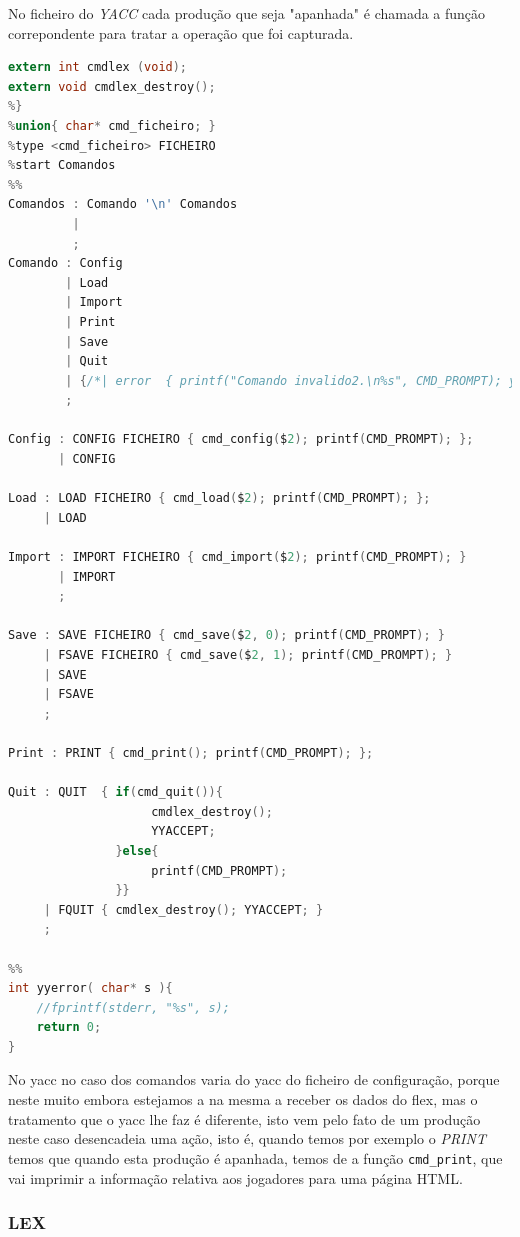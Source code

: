 \documentclass[11pt, a4paper, oneside]{article}
\begin{document}
No ficheiro do \textit{YACC} cada produção que seja "apanhada" é chamada a função correpondente para tratar a operação que foi capturada.

\begin{lstlisting}[language=C, caption={YACC do ficheiro cmd.}]
extern int cmdlex (void);
extern void cmdlex_destroy();
%}
%union{ char* cmd_ficheiro; }
%type <cmd_ficheiro> FICHEIRO
%start Comandos
%%
Comandos : Comando '\n' Comandos
         | 
         ;
Comando : Config
        | Load
        | Import
        | Print
        | Save
        | Quit
        | {/*| error  { printf("Comando invalido2.\n%s", CMD_PROMPT); yyclearin; yyerrok; }*/}
        ;

Config : CONFIG FICHEIRO { cmd_config($2); printf(CMD_PROMPT); };
       | CONFIG

Load : LOAD FICHEIRO { cmd_load($2); printf(CMD_PROMPT); };
     | LOAD

Import : IMPORT FICHEIRO { cmd_import($2); printf(CMD_PROMPT); }
       | IMPORT
       ;

Save : SAVE FICHEIRO { cmd_save($2, 0); printf(CMD_PROMPT); }
     | FSAVE FICHEIRO { cmd_save($2, 1); printf(CMD_PROMPT); }
     | SAVE
     | FSAVE
     ;

Print : PRINT { cmd_print(); printf(CMD_PROMPT); };

Quit : QUIT  { if(cmd_quit()){
                    cmdlex_destroy();
                    YYACCEPT;
               }else{
                    printf(CMD_PROMPT);
               }}
     | FQUIT { cmdlex_destroy(); YYACCEPT; }
     ;

%%
int yyerror( char* s ){
    //fprintf(stderr, "%s", s);
    return 0;
}
\end{lstlisting} 

No yacc no caso dos comandos varia do yacc do ficheiro de configuração, porque neste muito embora estejamos a na mesma a receber os dados do flex, mas o tratamento que o yacc lhe faz é diferente, isto vem pelo fato de um produção neste caso desencadeia uma ação, isto é, quando temos por exemplo o \textit{PRINT} temos que quando esta produção é apanhada, temos de a função \texttt{cmd\_print}, que vai imprimir a informação relativa aos jogadores para uma página HTML.

\subsubsection{LEX}
\end{document}
